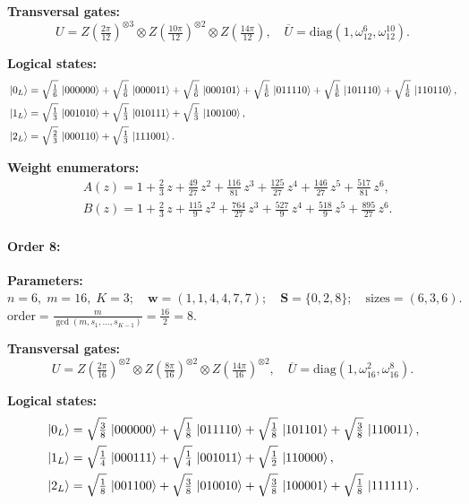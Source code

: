 \documentclass[pdflatex,sn-nature]{sn-jnl}%
\theoremstyle{thmstyleone}%
\theoremstyle{thmstyletwo}%
\theoremstyle{thmstylethree}%
\begin{document}
\begin{appendices}
\noindent\textbf{Transversal gates:}
\[
    U=Z \left(\tfrac{2\pi}{12}\right)^{\otimes3} \otimes Z \left(\tfrac{10\pi}{12}\right)^{\otimes2} \otimes Z \left(\tfrac{14\pi}{12}\right),\quad
    \overline U=\mathrm{diag}(1,\omega_{12}^{6},\omega_{12}^{10}).
\]

\noindent\textbf{Logical states:}
\begin{align*}
  &\ket{0_L} = \sqrt{\tfrac{1}{6}}\,\ket{000000} + \sqrt{\tfrac{1}{6}}\,\ket{000011} + \sqrt{\tfrac{1}{6}}\,\ket{000101} + \sqrt{\tfrac{1}{6}}\,\ket{011110} + \sqrt{\tfrac{1}{6}}\,\ket{101110} + \sqrt{\tfrac{1}{6}}\,\ket{110110}, \\
  &\ket{1_L} = \sqrt{\tfrac{1}{3}}\,\ket{001010} + \sqrt{\tfrac{1}{3}}\,\ket{010111} + \sqrt{\tfrac{1}{3}}\,\ket{100100}, \\
  &\ket{2_L} = \sqrt{\tfrac{2}{3}}\,\ket{000110} + \sqrt{\tfrac{1}{3}}\,\ket{111001}. 
\end{align*}

\noindent\textbf{Weight enumerators:}
\begin{align*}
    &A(z) = 1 + \tfrac{2}{3}\,z + \tfrac{49}{27}\,z^{2} + \tfrac{116}{81}\,z^{3} + \tfrac{125}{27}\,z^{4} + \tfrac{146}{27}\,z^{5} + \tfrac{517}{81}\,z^{6}, \\
    &B(z) = 1 + \tfrac{2}{3}\,z + \tfrac{115}{9}\,z^{2} + \tfrac{764}{27}\,z^{3} + \tfrac{527}{9}\,z^{4} + \tfrac{518}{9}\,z^{5} + \tfrac{895}{27}\,z^{6}.
\end{align*}

\paragraph{\textbf{Order 8:}}
\noindent\textbf{Parameters:} $n=6,\; m=16,\; K=3;\quad \mathbf w=(1, 1, 4, 4, 7, 7);\quad \mathbf S=\{0, 2, 8\};\quad \text{sizes}=\left(6, 3, 6\right).$ $\displaystyle \text{order}=\frac{m}{\gcd(m,s_1,\dots,s_{K-1})}=\frac{16}{2}=8.$

\noindent\textbf{Transversal gates:}
\[
    U=Z \left(\tfrac{2\pi}{16}\right)^{\otimes2} \otimes Z \left(\tfrac{8\pi}{16}\right)^{\otimes2} \otimes Z \left(\tfrac{14\pi}{16}\right)^{\otimes2},\quad
    \overline U=\mathrm{diag}(1,\omega_{16}^{2},\omega_{16}^{8}).
\]

\noindent\textbf{Logical states:}
\begin{align*}
  &\ket{0_L} = \sqrt{\tfrac{3}{8}}\,\ket{000000} + \sqrt{\tfrac{1}{8}}\,\ket{011110} + \sqrt{\tfrac{1}{8}}\,\ket{101101} + \sqrt{\tfrac{3}{8}}\,\ket{110011}, \\
  &\ket{1_L} = \sqrt{\tfrac{1}{4}}\,\ket{000111} + \sqrt{\tfrac{1}{4}}\,\ket{001011} + \sqrt{\tfrac{1}{2}}\,\ket{110000}, \\
  &\ket{2_L} = \sqrt{\tfrac{1}{8}}\,\ket{001100} + \sqrt{\tfrac{3}{8}}\,\ket{010010} + \sqrt{\tfrac{3}{8}}\,\ket{100001} + \sqrt{\tfrac{1}{8}}\,\ket{111111}.  
\end{align*}


\end{appendices}
\end{document}

